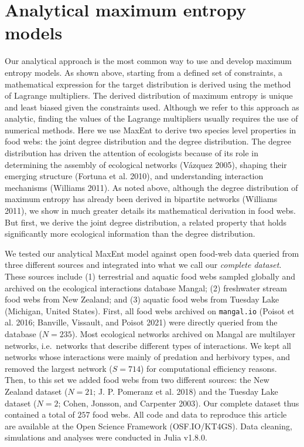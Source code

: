 \documentclass[10pt,oneside]{article}
\begin{document}
\hypertarget{analytical-maximum-entropy-models}{%
\section{Analytical maximum entropy
models}\label{analytical-maximum-entropy-models}}

Our analytical approach is the most common way to use and develop
maximum entropy models. As shown above, starting from a defined set of
constraints, a mathematical expression for the target distribution is
derived using the method of Lagrange multipliers. The derived
distribution of maximum entropy is unique and least biased given the
constraints used. Although we refer to this approach as analytic,
finding the values of the Lagrange multipliers usually requires the use
of numerical methods. Here we use MaxEnt to derive two species level
properties in food webs: the joint degree distribution and the degree
distribution. The degree distribution has driven the attention of
ecologists because of its role in determining the assembly of ecological
networks (Vázquez 2005), shaping their emerging structure (Fortuna et
al. 2010), and understanding interaction mechanisms (Williams 2011). As
noted above, although the degree distribution of maximum entropy has
already been derived in bipartite networks (Williams 2011), we show in
much greater details its mathematical derivation in food webs. But
first, we derive the joint degree distribution, a related property that
holds significantly more ecological information than the degree
distribution.

We tested our analytical MaxEnt model against open food-web data queried
from three different sources and integrated into what we call our
\emph{complete dataset}. These sources include (1) terrestrial and
aquatic food webs sampled globally and archived on the ecological
interactions database Mangal; (2) freshwater stream food webs from New
Zealand; and (3) aquatic food webs from Tuesday Lake (Michigan, United
States). First, all food webs archived on \texttt{mangal.io} (Poisot et
al. 2016; Banville, Vissault, and Poisot 2021) were directly queried
from the database (\(N = 235\)). Most ecological networks archived on
Mangal are multilayer networks, i.e.~networks that describe different
types of interactions. We kept all networks whose interactions were
mainly of predation and herbivory types, and removed the largest network
(\(S = 714\)) for computational efficiency reasons. Then, to this set we
added food webs from two different sources: the New Zealand dataset
(\(N = 21\); J. P. Pomeranz et al. 2018) and the Tuesday Lake dataset
(\(N = 2\); Cohen, Jonsson, and Carpenter 2003). Our complete dataset
thus contained a total of \(257\) food webs. All code and data to
reproduce this article are available at the Open Science Framework
(OSF.IO/KT4GS). Data cleaning, simulations and analyses were conducted
in Julia v1.8.0.
\end{document}
